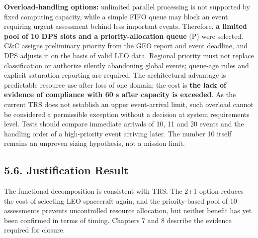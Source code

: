 \textbf{Overload-handling options:} unlimited parallel processing is not supported by fixed computing capacity, while a simple FIFO queue may block an event requiring urgent assessment behind less important events. Therefore, \textbf{a limited pool of 10 DPS slots and a priority-allocation queue} (P) were selected. C\&C assigns preliminary priority from the GEO report and event deadline, and DPS adjusts it on the basis of valid LEO data. Regional priority must not replace classification or authorize silently abandoning global events; queue-age rules and explicit saturation reporting are required. The architectural advantage is predictable resource use after loss of one domain; the cost is \textbf{the lack of evidence of compliance with 60 s after capacity is exceeded}. As the current TRS does not establish an upper event-arrival limit, such overload cannot be considered a permissible exception without a decision at system requirements level. Tests should compare immediate arrivals of 10, 11 and 20 events and the handling order of a high-priority event arriving later. The number 10 itself remains an unproven sizing hypothesis, not a mission limit.

\subsection{5.6. Justification Result}\label{ddjf-5-6}

The functional decomposition is consistent with TRS. The 2+1 option reduces the cost of selecting LEO spacecraft again, and the priority-based pool of 10 assessments prevents uncontrolled resource allocation, but neither benefit has yet been confirmed in terms of timing. Chapters 7 and 8 describe the evidence required for closure.

\par\noindent{\color{TableBorderBlue}\rule{\linewidth}{0.4pt}}\par
